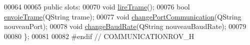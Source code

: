 \begin{DoxyCode}
00064 
00065     \textcolor{keyword}{public} slots:
00070         \textcolor{keywordtype}{void} \hyperlink{class_communication_rov_a5822d2f41553221ea876ea09e148f859}{lireTrame}();
00076         \textcolor{keywordtype}{bool} \hyperlink{class_communication_rov_ac243fcfb073f4ceaf58fab1d41207801}{envoieTrame}(QString trame);
00077         \textcolor{keywordtype}{void} \hyperlink{class_communication_rov_ad46397a58ba7704fbd5ac5748e083004}{changePortCommunication}(QString nouveauPort); 
00078         \textcolor{keywordtype}{void} \hyperlink{class_communication_rov_ac49ffc6f2e6ae22ea9f99e10ca0a4163}{changeBaudRate}(QString nouveauBaudRate); 
00079 
00080 \};
00081 
00082 \textcolor{preprocessor}{#endif // COMMUNICATIONROV\_H}
\end{DoxyCode}
